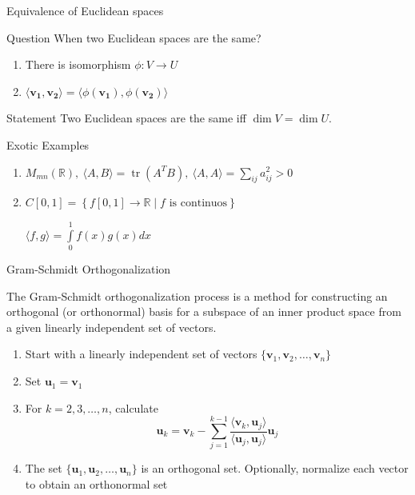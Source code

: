 \documentclass[fullscreen=true, bookmarks=true, hyperref={pdfencoding=unicode}]{beamer}
\begin{document}
\begin{frame}{Equivalence of Euclidean spaces}
  \begin{block}{Question}
    When two Euclidean spaces are the same?
  \end{block}

  \begin{enumerate}
    \item There is isomorphism $\phi: V \to U$
    \item $\langle \mathbf{v_1}, \mathbf{v_2} \rangle = \langle \phi(\mathbf{v_1}), \phi(\mathbf{v_2}) \rangle$
  \end{enumerate}

  \begin{block}{Statement}
    Two Euclidean spaces are the same iff $\dim V = \dim U$.
  \end{block}
\end{frame}


\begin{frame}{Exotic Examples}
  \begin{enumerate}
    \item $M_{mn}(\mathbb{R}),\ 
    \langle A, B \rangle = \operatorname{tr}(A^TB),\ 
    \langle A, A \rangle = \sum\limits_{ij} a_{ij}^2 > 0$
    \item $C[0, 1] = \left\{f[0, 1] \to \mathbb{R} \mid f \text{ is continuos} \right\}$
    
    $\langle f, g \rangle = \int\limits_0^1 f(x)g(x)dx$ 
  \end{enumerate}
\end{frame}


\begin{frame}{Gram-Schmidt Orthogonalization}
  
  The Gram-Schmidt orthogonalization process is a method for constructing 
  an orthogonal (or orthonormal) basis for a subspace 
  of an inner product space from a given linearly independent set of vectors.
  
  \begin{enumerate}
  \item Start with a linearly independent 
  set of vectors $\{\mathbf{v}_1, \mathbf{v}_2, \dots, \mathbf{v}_n\}$
  \item Set $\mathbf{u}_1 = \mathbf{v}_1$
  \item For $k = 2, 3, \dots, n$, calculate
  \[
  \mathbf{u}_k = \mathbf{v}_k - \sum_{j=1}^{k-1} \frac{\langle \mathbf{v}_k, \mathbf{u}_j \rangle}{\langle \mathbf{u}_j, \mathbf{u}_j \rangle} \mathbf{u}_j
  \]
  \item The set $\{\mathbf{u}_1, \mathbf{u}_2, \dots, \mathbf{u}_n\}$ is an orthogonal set. Optionally, normalize each vector to obtain an orthonormal set
  \end{enumerate} 
\end{frame}
\end{document}

